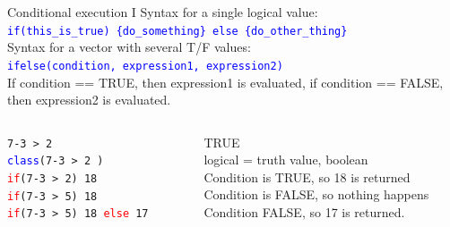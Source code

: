 \documentclass[xcolor=table,       handout,    xcolor=dvipsnames]{beamer}\usepackage[]{graphicx}\usepackage[]{color}
\newcommand{\rcode}[1]{\texttt{\textcolor{Blue}{#1}}} %
\begin{document}

\begin{frame}[fragile]{Conditional execution I}
Syntax for a single logical value:\\
\rcode{\alert{if}(this\_is\_true) \{do\_something\} \alert{else} \{do\_other\_thing\}}\\[\baselineskip]
\pause
Syntax for a vector with several T/F values:\\
\rcode{\alert{ifelse}(condition, expression1, expression2)}\\[\baselineskip]
\pause
If condition == TRUE, then expression1 is evaluated,
if condition == FALSE, then expression2 is evaluated.\\[1em]
\pause
\begin{columns}
\begin{column}{.40\textwidth}
\texttt{7-3 > 2 \\
\textcolor{blue}{class}(7-3 > 2 ) \\
\textcolor{red}{if}(7-3 > 2) 18  \\
\textcolor{red}{if}(7-3 > 5) 18  \\
\textcolor{red}{if}(7-3 > 5) 18 \textcolor{red}{else} 17 }
\end{column}
\begin{column}{.59\textwidth}
\pause TRUE\\
\pause logical = truth value, boolean\\
\pause Condition is TRUE, so 18 is returned\\
\pause Condition is FALSE, so nothing happens\\
\pause Condition FALSE, so 17 is returned.
\end{column}
\end{columns}
\end{frame}

\end{document}
